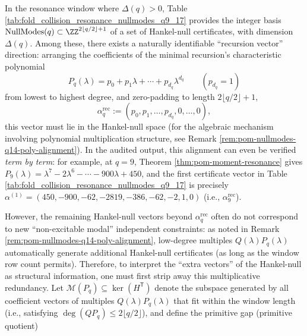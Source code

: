 



\begin{remark}\label{rem:pom-nullmodes-recurrence-plus-signature}
In the resonance window where \(\Delta(q)>0\), Table \ref{tab:fold_collision_resonance_nullmodes_q9_17} provides the integer basis
\(
\mathrm{NullModes}(q)\subset\ZZ^{2\lfloor q/2\rfloor+1}
\)
of a set of Hankel-null certificates, with dimension \(\Delta(q)\).
Among these, there exists a naturally identifiable ``recursion vector'' direction: arranging the coefficients of the minimal recursion's characteristic polynomial
\[
P_q(\lambda)=p_0+p_1\lambda+\cdots+p_{d_q}\lambda^{d_q}\qquad(p_{d_q}=1)
\]
from lowest to highest degree, and zero-padding to length \(2\lfloor q/2\rfloor+1\),
\[
\alpha^{\mathrm{rec}}_q:=(p_0,p_1,\ldots,p_{d_q},0,\ldots,0),
\]
this vector must lie in the Hankel-null space (for the algebraic mechanism involving polynomial multiplication structure, see Remark \ref{rem:pom-nullmodes-q14-poly-alignment}).
In the audited output, this alignment can even be verified \emph{term by term}: for example, at \(q=9\), Theorem \ref{thm:pom-moment-resonance} gives
\(
P_9(\lambda)=\lambda^7-2\lambda^6-\cdots-900\lambda+450
\), and the first certificate vector in Table \ref{tab:fold_collision_resonance_nullmodes_q9_17} is precisely
\(
\alpha^{(1)}=(450,-900,-62,-2819,-386,-62,-2,1,0)
\)
(i.e., \(\alpha^{\mathrm{rec}}_9\)).
\par
However, the remaining Hankel-null vectors beyond \(\alpha^{\mathrm{rec}}_q\) often do not correspond to new ``non-excitable modal'' independent constraints: as noted in Remark \ref{rem:pom-nullmodes-q14-poly-alignment}, low-degree multiples \(Q(\lambda)P_q(\lambda)\) automatically generate additional Hankel-null certificates (as long as the window row count permits).
Therefore, to interpret the ``extra vectors'' of the Hankel-null as structural information, one must first strip away this multiplicative redundancy.
Let \(\mathcal{M}(P_q)\subseteq\ker(H^{\mathsf T})\) denote the subspace generated by all coefficient vectors of multiples \(Q(\lambda)P_q(\lambda)\) that fit within the window length (i.e., satisfying \(\deg(QP_q)\le 2\lfloor q/2\rfloor\)), and define the primitive gap (primitive quotient)

\end{remark}
